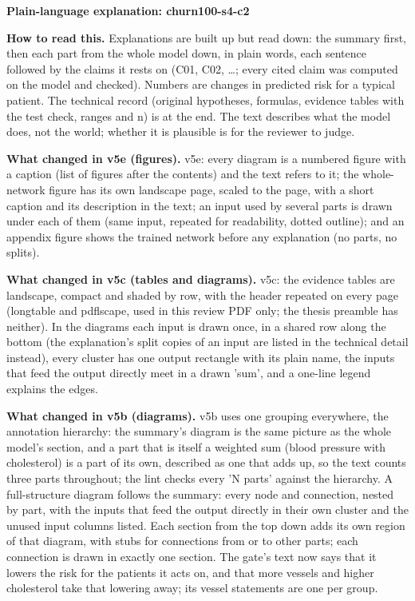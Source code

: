 \documentclass[a4paper,10pt]{article}
\begin{document}
\begin{center}{\Large\bfseries Plain-language explanation: churn100-s4-c2\par}\vspace{2mm}{\small AI-assisted drafts for review. Nothing here has been verified by a person.\par}\end{center}
\noindent\textbf{How to read this.} Explanations are built up but read down: the summary first, then each part from the whole model down, in plain words, each sentence followed by the claims it rests on (C01, C02, \ldots; every cited claim was computed on the model and checked). Numbers are changes in predicted risk for a typical patient. The technical record (original hypotheses, formulas, evidence tables with the test check, ranges and n) is at the end. The text describes what the model does, not the world; whether it is plausible is for the reviewer to judge.
\par\medskip\noindent\textbf{What changed in v5e (figures).} v5e: every diagram is a numbered figure with a caption (list of figures after the contents) and the text refers to it; the whole-network figure has its own landscape page, scaled to the page, with a short caption and its description in the text; an input used by several parts is drawn under each of them (same input, repeated for readability, dotted outline); and an appendix figure shows the trained network before any explanation (no parts, no splits).
\par\medskip\noindent\textbf{What changed in v5c (tables and diagrams).} v5c: the evidence tables are landscape, compact and shaded by row, with the header repeated on every page (longtable and pdflscape, used in this review PDF only; the thesis preamble has neither). In the diagrams each input is drawn once, in a shared row along the bottom (the explanation's split copies of an input are listed in the technical detail instead), every cluster has one output rectangle with its plain name, the inputs that feed the output directly meet in a drawn 'sum', and a one-line legend explains the edges.
\par\medskip\noindent\textbf{What changed in v5b (diagrams).} v5b uses one grouping everywhere, the annotation hierarchy: the summary's diagram is the same picture as the whole model's section, and a part that is itself a weighted sum (blood pressure with cholesterol) is a part of its own, described as one that adds up, so the text counts three parts throughout; the lint checks every 'N parts' against the hierarchy. A full-structure diagram follows the summary: every node and connection, nested by part, with the inputs that feed the output directly in their own cluster and the unused input columns listed. Each section from the top down adds its own region of that diagram, with stubs for connections from or to other parts; each connection is drawn in exactly one section. The gate's text now says that it lowers the risk for the patients it acts on, and that more vessels and higher cholesterol take that lowering away; its vessel statements are one per group.
\end{document}
